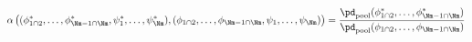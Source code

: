 \begin{equation}
  \alpha \left(
    (\phi_{1 \cap 2}^{*}, \ldots, \phi_{\Nm - 1 \cap \Nm}^{*}, \psi_{1}^{*}, \ldots, \psi_{\Nm}^{*}),
    (\phi_{1 \cap 2}, \ldots, \phi_{\Nm - 1 \cap \Nm}, \psi_{1}, \ldots, \psi_{\Nm})
  \right)
  =
  \frac {
    \pd_{\text{pool}}(\phi_{1 \cap 2}^{*}, \ldots, \phi_{\Nm - 1 \cap \Nm}^{*})
  } {
    \pd_{\text{pool}}(\phi_{1 \cap 2}, \ldots, \phi_{\Nm - 1 \cap \Nm})
  }
  \label{eqn:stage-Mplus1-acceptance-probability}
\end{equation}
